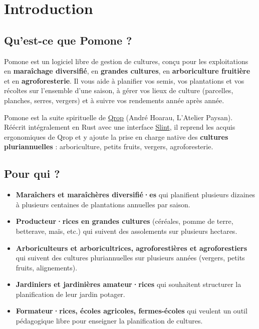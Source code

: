 \chapter{Introduction}

\section{Qu'est-ce que Pomone ?}

Pomone est un logiciel libre de gestion de cultures, conçu pour les exploitations en \textbf{maraîchage diversifié}, en \textbf{grandes cultures}, en \textbf{arboriculture fruitière} et en \textbf{agroforesterie}. Il vous aide à planifier vos semis, vos plantations et vos récoltes sur l'ensemble d'une saison, à gérer vos lieux de culture (parcelles, planches, serres, vergers) et à suivre vos rendements année après année.

Pomone est la suite spirituelle de \href{https://qrop.readthedocs.io/}{Qrop} (André Hoarau, L'Atelier Paysan). Réécrit intégralement en Rust avec une interface \href{https://slint.dev/}{Slint}, il reprend les acquis ergonomiques de Qrop et y ajoute la prise en charge native des \textbf{cultures pluriannuelles} : arboriculture, petits fruits, vergers, agroforesterie.

\section{Pour qui ?}

\begin{itemize}
  \item \textbf{Maraîchers et maraîchères diversifié·es} qui planifient plusieurs dizaines à plusieurs centaines de plantations annuelles par saison.
  \item \textbf{Producteur·rices en grandes cultures} (céréales, pomme de terre, betterave, maïs, etc.) qui suivent des assolements sur plusieurs hectares.
  \item \textbf{Arboriculteurs et arboricultrices, agroforestières et agroforestiers} qui suivent des cultures pluriannuelles sur plusieurs années (vergers, petits fruits, alignements).
  \item \textbf{Jardiniers et jardinières amateur·rices} qui souhaitent structurer la planification de leur jardin potager.
  \item \textbf{Formateur·rices, écoles agricoles, fermes-écoles} qui veulent un outil pédagogique libre pour enseigner la planification de cultures.
\end{itemize}

